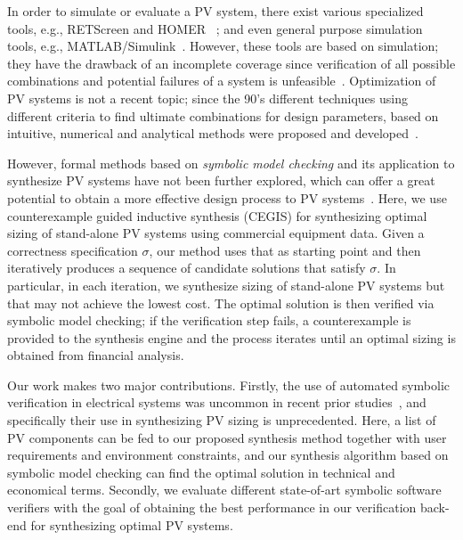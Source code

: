 \documentclass[runningheads]{llncs}
\begin{document}
In order to simulate or evaluate a PV system, there exist various specialized tools, e.g., RETScreen and HOMER~\cite{Pradhan,Swarnkar}%
; and even general purpose simulation tools, e.g., MATLAB/Simulink~\cite{Gow1999}. %
 However, these tools are based on simulation; they have the drawback of an incomplete coverage  since verification of all possible combinations and potential failures of a system is unfeasible~\cite{ClarkeHV18}. 
 Optimization of PV systems is not a recent topic; since the 90's different techniques using different criteria to find ultimate combinations for design parameters, based on intuitive, numerical and analytical methods were proposed and developed~\cite{Alsadi2018}.
 
However, formal methods based on \textit{symbolic model checking} and its application to synthesize PV systems have not been further explored, which can offer a great potential to obtain a more effective design process to PV systems~\cite{ClarkeHV18}. Here, we use counterexample guided inductive synthesis (CEGIS) for synthesizing optimal sizing of stand-alone PV systems using commercial equipment data. Given a correctness specification $\sigma$, our method uses that as starting point and then iteratively produces a sequence of candidate solutions that satisfy $\sigma$. In particular, in each iteration, we synthesize sizing of stand-alone PV systems but that may not achieve the lowest cost. The optimal solution is then verified via symbolic model checking; if the verification step fails, a counterexample is provided to the synthesis engine and the process iterates until an optimal sizing is obtained from financial analysis.

Our work makes two major contributions. Firstly, the use of automated symbolic verification in electrical systems was uncommon in recent prior studies~\cite{TrindadeCordeiro19}, and specifically their use in synthesizing PV sizing is unprecedented. Here, a list of PV components %
can be fed to our proposed synthesis method together with user requirements and environment constraints, and our synthesis algorithm based on symbolic model checking can find the optimal solution in technical and economical terms. Secondly, we evaluate different state-of-art symbolic software verifiers with the goal of obtaining the best performance in our verification back-end for synthesizing optimal PV systems.
\end{document}
